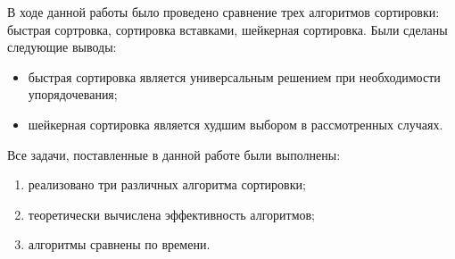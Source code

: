 \Conclusion

В ходе данной работы было проведено сравнение трех алгоритмов сортировки: быстрая сортровка, сортировка вставками, шейкерная сортировка. Были сделаны следующие выводы:

\begin{itemize}
    \item быстрая сортировка является универсальным решением при необходимости упорядочевания;
    \item шейкерная сортировка является худшим выбором в рассмотренных случаях.
\end{itemize}

Все задачи, поставленные в данной работе были выполнены:

\begin{enumerate}
    \item реализовано три различных алгоритма сортировки;
    \item теоретически вычислена эффективность алгоритмов;
    \item алгоритмы сравнены по времени.
\end{enumerate}

